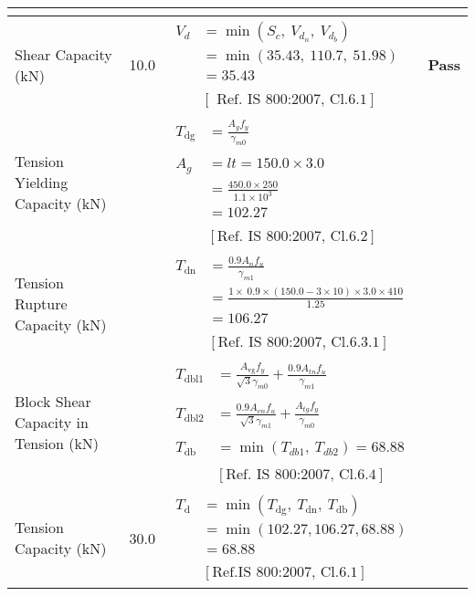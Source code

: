 \documentclass{article}%
\begin{document}
\begin{longtable}{|p{3.5cm}|p{5cm}|p{6cm}|p{1.5cm}|}
{\textbf{}
}\\%
\hline%
Shear Capacity (kN)&10.0&$\begin{aligned} V_d &= \min(S_c,~V_{d_n},~V_{d_b})\\ &= \min(35.43,~110.7,~51.98)\\ &=35.43\\ \\ & [\text{ Ref. IS 800:2007, Cl.6.1}] \end{aligned}$&\textcolor{OsdagGreen}{ 
\textbf{Pass}
}\\%
\hline%
Tension Yielding Capacity (kN)&&$\begin{aligned} T_{\text{dg}} &= \frac{A_g f_y}{\gamma_{m0}}\\ \\ A_{g} &= l t =150.0\times3.0\\ &=\frac{450.0\times250}{1.1\times 10^3}\\ &=102.27\\ \\ & [\text{Ref. IS 800:2007, Cl.6.2}] \end{aligned}$&\textcolor{OsdagGreen}{ 
\textbf{}
}\\%
\hline%
Tension Rupture Capacity (kN)&&$\begin{aligned} T_{\text{dn}} &= \frac{0.9 A_{n} f_u}{\gamma_{m1}}\\ &=\frac{1\times~0.9\times (150.0-3\times10)\times3.0\times410}{1.25}\\ &=106.27\\ \\ & [\text{Ref. IS 800:2007, Cl.6.3.1}] \end{aligned}$&\textcolor{OsdagGreen}{ 
\textbf{}
}\\%
\hline%
Block Shear Capacity in Tension (kN)&&$\begin{aligned}T_{\text{dbl1}} &= \frac{A_{\text{vg}} f_{y}}{\sqrt{3} \gamma_{m0}} + \frac{0.9 A_{tn} f_{u}}{\gamma_{m1}}\\ \\ T_{\text{dbl2}} &= \frac{0.9A_{vn} f_{u}}{\sqrt{3} \gamma_{m1}} + \frac{A_{tg} f_{y}}{\gamma_{m0}}\\ \\ T_{\text{db}} &= \min(T_{db1},~ T_{db2})= 68.88\\ \\ & [\text{Ref. IS 800:2007, Cl.6.4}] \end{aligned}$&\textcolor{OsdagGreen}{ 
\textbf{}
}\\%
\hline%
Tension Capacity (kN)&30.0&$\begin{aligned} T_{\text{d}} &= \min(T_{\text{dg}},~T_{\text{dn}},~T_{\text{db}})\\ &= \min(102.27,106.27,68.88)\\ &=68.88\\ \\ & [\text{Ref.IS 800:2007, Cl.6.1}] \end{aligned}$&\textcolor{OsdagGreen}{ 
}
\end{longtable}
\end{document}

